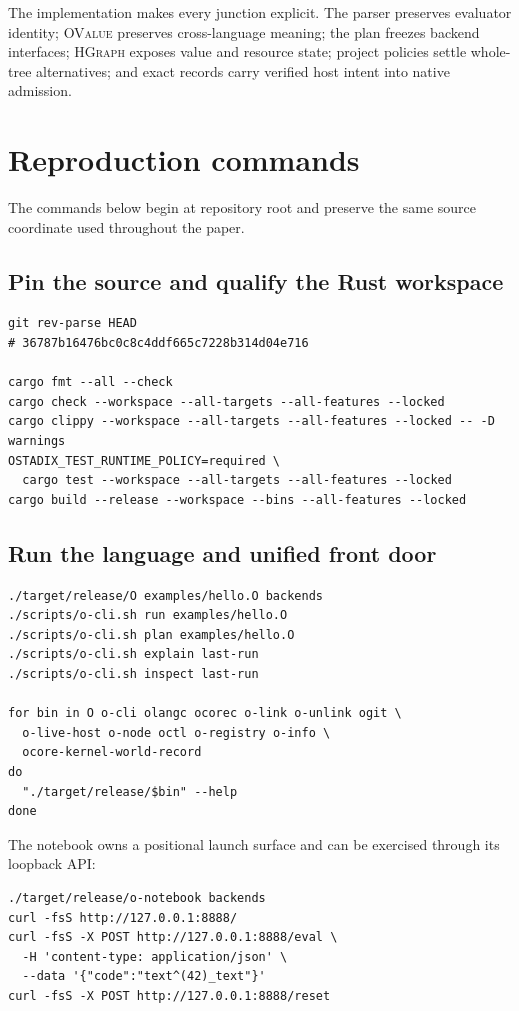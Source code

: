 \documentclass[11pt,oneside]{article}
\newcommand{\ovalue}{\textsc{OValue}}
\newcommand{\hgraph}{\textsc{HGraph}}
\begin{document}
The implementation makes every junction explicit. The parser preserves
evaluator identity; \ovalue{} preserves cross-language meaning; the plan
freezes backend interfaces; \hgraph{} exposes value and resource state;
project policies settle whole-tree alternatives; and exact records carry
verified host intent into native admission.

\section{Reproduction commands}

The commands below begin at repository root and preserve the same source
coordinate used throughout the paper.

\subsection{Pin the source and qualify the Rust workspace}

\begin{lstlisting}[style=plaincode]
git rev-parse HEAD
# 36787b16476bc0c8c4ddf665c7228b314d04e716

cargo fmt --all --check
cargo check --workspace --all-targets --all-features --locked
cargo clippy --workspace --all-targets --all-features --locked -- -D warnings
OSTADIX_TEST_RUNTIME_POLICY=required \
  cargo test --workspace --all-targets --all-features --locked
cargo build --release --workspace --bins --all-features --locked
\end{lstlisting}

\subsection{Run the language and unified front door}

\begin{lstlisting}[style=plaincode]
./target/release/O examples/hello.O backends
./scripts/o-cli.sh run examples/hello.O
./scripts/o-cli.sh plan examples/hello.O
./scripts/o-cli.sh explain last-run
./scripts/o-cli.sh inspect last-run

for bin in O o-cli olangc ocorec o-link o-unlink ogit \
  o-live-host o-node octl o-registry o-info \
  ocore-kernel-world-record
do
  "./target/release/$bin" --help
done
\end{lstlisting}

The notebook owns a positional launch surface and can be exercised through its
loopback API:

\begin{lstlisting}[style=plaincode]
./target/release/o-notebook backends
curl -fsS http://127.0.0.1:8888/
curl -fsS -X POST http://127.0.0.1:8888/eval \
  -H 'content-type: application/json' \
  --data '{"code":"text^(42)_text"}'
curl -fsS -X POST http://127.0.0.1:8888/reset
\end{lstlisting}
\end{document}
